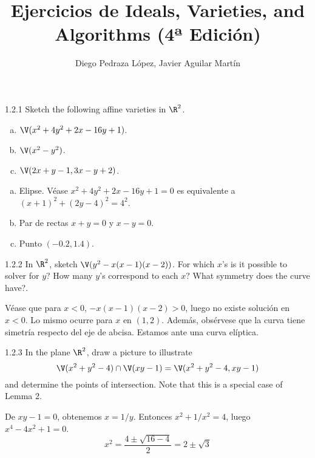 \documentclass[twoside]{article}
\begin{document}
\title{Ejercicios de Ideals, Varieties, and Algorithms (4ª Edición)}
\author{Diego Pedraza López, Javier Aguilar Martín}
\maketitle

\begin{ejercicio}{1.2.1}
Sketch the following affine varieties in $\R^2$.
\begin{enumerate}[a.]
\item $\V(x^2+4y^2+2x-16y+1)$.
\item $\V(x^2-y^2)$.
\item $\V(2x+y-1,3x-y+2)$.
\end{enumerate}
\end{ejercicio}
\begin{solucion}
\begin{enumerate}[a.]
\item Elipse. Véase $x^2+4y^2+2x-16y+1=0$ es equivalente a $(x+1)^2+(2y-4)^2=4^2$.
\item Par de rectas $x+y=0$ y $x-y=0$.
\item Punto $(-0.2,1.4)$.
\end{enumerate}
\end{solucion}

\newpage

\begin{ejercicio}{1.2.2}
In $\R^2$, sketch $\V(y^2-x(x-1)(x-2))$.
For which $x$'s is it possible to solver for $y$?
How many $y$'s correspond to each $x$?
What symmetry does the curve have?.
\end{ejercicio}
\begin{solucion}
Véase que para $x<0$, $-x(x-1)(x-2)>0$, luego no existe solución en $x<0$.
Lo mismo ocurre para $x$ en $(1,2)$.
Además, obsérvese que la curva tiene simetría respecto del eje de abcisa.
Estamos ante una curva elíptica.
\end{solucion}

\newpage

\begin{ejercicio}{1.2.3}
In the plane $\R^2$, draw a picture to illustrate
\[ \V(x^2+y^2-4) \cap \V(xy-1) = \V(x^2+y^2-4,xy-1) \]
and determine the points of intersection. Note that this is a special case of Lemma 2.
\end{ejercicio}
\begin{solucion}
De $xy-1=0$, obtenemos $x=1/y$. Entonces $x^2+1/x^2=4$, luego $x^4-4x^2+1=0$.
\[ x^2 = \frac{4 \pm \sqrt{16-4}}{2} = 2 \pm \sqrt{3} \]
\end{solucion}
\end{document}
